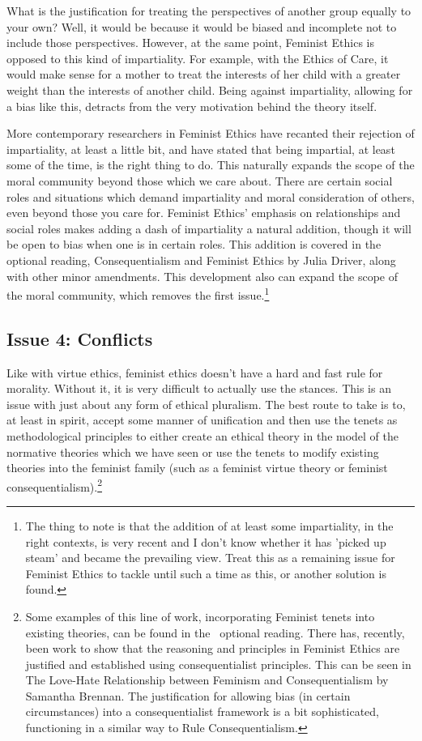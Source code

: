 What is the justification for treating the perspectives of another group equally to your own? Well, it would be because it would be biased and incomplete not to include those perspectives. However, at the same point, Feminist Ethics is opposed to this kind of impartiality. For example, with the Ethics of Care, it would make sense for a mother to treat the interests of her child with a greater weight than the interests of another child. Being against impartiality, allowing for a bias like this, detracts from the very motivation behind the theory itself. 

More contemporary researchers in Feminist Ethics have recanted their rejection of impartiality, at least a little bit, and have stated that being impartial, at least some of the time, is the right thing to do. This naturally expands the scope of the moral community beyond those which we care about. There are certain social roles and situations which demand impartiality and moral consideration of others, even beyond those you care for. Feminist Ethics' emphasis on relationships and social roles makes adding a dash of impartiality a natural addition, though it will be open to bias when one is in certain roles. This addition is covered in the optional reading, Consequentialism and Feminist Ethics by Julia Driver, along with other minor amendments. This development also can expand the scope of the moral community, which removes the first issue.\footnote{The thing to note is that the addition of at least some impartiality, in the right contexts, is very recent and I don't know whether it has 'picked up steam' and became the prevailing view. Treat this as a remaining issue for Feminist Ethics to tackle until such a time as this, or another solution is found.}

\subsection{Issue 4: Conflicts}

Like with virtue ethics, feminist ethics doesn’t have a hard and fast rule for morality. Without it, it is very difficult to actually use the stances. This is an issue with just about any form of ethical pluralism. The best route to take is to, at least in spirit, accept some manner of unification and then use the tenets as methodological principles to either create an ethical theory in the model of the normative theories which we have seen or use the tenets to modify existing theories into the feminist family (such as a feminist virtue theory or feminist consequentialism).\footnote{Some examples of this line of work, incorporating Feminist tenets into existing theories, can be found in the  optional reading. There has, recently, been work to show that the reasoning and principles in Feminist Ethics are justified and established using consequentialist principles. This can be seen in The Love-Hate Relationship between Feminism and Consequentialism by Samantha Brennan. The justification for allowing bias (in certain circumstances) into a consequentialist framework is a bit sophisticated, functioning in a similar way to Rule Consequentialism.}


